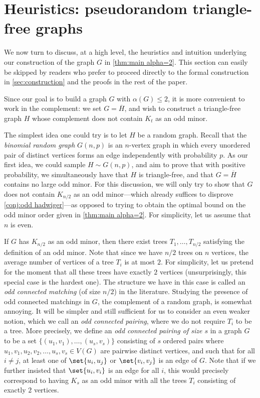 \documentclass[11pt,reqno,oneside]{amsart}
\theoremstyle{definition}
\newcommand\ol[1]{\overline{#1}}
\newcommand\1{\mathbf{1}}
\let\leq\leqslant
\begin{document}
\section{Heuristics: pseudorandom triangle-free graphs}
We now turn to discuss, at a high level, the heuristics and intuition  underlying our construction of the graph $G$ in \cref{thm:main alpha=2}. This section can easily be skipped by readers who prefer to proceed directly to the formal construction in \cref{sec:construction} and the proofs in the rest of the paper. 

Since our goal is to build a graph $G$ with $\alpha(G)\leq 2$, it is more convenient to work in the complement: we set $G=\ol H$, and wish to construct a triangle-free graph $H$ whose complement does not contain $K_t$ as an odd minor. 

The simplest idea one could try is to let $H$ be a random graph. Recall that the \emph{binomial random graph} $G(n,p)$ is an $n$-vertex graph in which every unordered pair of distinct vertices forms an edge independently with probability $p$. As our first idea, we could sample $H \sim G(n,p)$, and aim to prove that with positive probability, we simultaneously have that $H$ is triangle-free, and that $G=\ol H$ contains no large odd minor. For this discussion, we will only try to show that $G$ does not contain $K_{n/2}$ as an odd minor---which already suffices to disprove \cref{conj:odd hadwiger}---as opposed to trying to obtain the optimal bound on the odd minor order given in \cref{thm:main alpha=2}. For simplicity, let us assume that $n$ is even.

If $G$ has $K_{n/2}$ as an odd minor, then there exist trees $T_1,\dots,T_{n/2}$ satisfying the definition of an odd minor. Note that since we have $n/2$ trees on $n$ vertices, the average number of vertices of a tree $T_i$ is at most $2$. For simplicity, let us pretend for the moment that all these trees have exactly $2$ vertices (unsurprisingly, this special case is the hardest one). The structure we have in this case is called an \emph{odd connected matching} (of size $n/2$) in the literature. Studying the presence of odd connected matchings in $G$, the complement of a random graph, is somewhat annoying. It will be simpler and still sufficient for us to consider an even weaker notion,
which we call an \emph{odd connected pairing}, where we do not require $T_i$ to be a tree. More precisely, we define an \emph{odd connected pairing of size $s$} in a graph $G$ to be a set $\{(u_1,v_1),\ldots,(u_s,v_s)\}$ consisting of $s$ ordered pairs where $u_1,v_1,u_2,v_2,\dots,u_s,v_s \in V(G)$ are pairwise distinct vertices, and such that for all $i \neq j$, at least one of $\set{u_i, u_j}$ or $\set{v_i, v_j}$ is an edge of $G$. Note that if we further insisted that $\set{u_i, v_i}$ is an edge for all $i$, this would precisely correspond to having $K_s$ as an odd minor with all the trees $T_i$ consisting of exactly $2$ vertices. 
\end{document}
